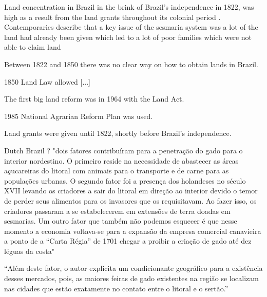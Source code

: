 \documentclass{article}
\begin{document}
Land concentration in Brazil in the brink of Brazil's independence in 1822, was high as a result from the land grants throughout its colonial period \parencite{Smith1972-dv}.
Contemporaries describe that a key issue of the sesmaria system was a lot of the land had already been given which led to a lot of poor families which were not able to claim land \parencite[p.~42-43]{Lima1954-td}



Between 1822 and 1850 there was no clear way on how to obtain lands in Brazil. 

1850 Land Law allowed [...]

The first big land reform was in 1964 with the Land Act.

1985 National Agrarian Reform Plan was used.

Land grants were given until 1822, shortly before Brazil's independence.



Dutch Brazil ? "dois fatores contribuíram para a penetração do gado para o interior nordestino. O primeiro reside na necessidade de abastecer as áreas açucareiras do litoral com animais para o transporte e de carne para as populações urbanas. O segundo fator foi a presença dos holandeses no século XVII levando os criadores a sair do litoral em direção ao interior devido o temor de perder seus alimentos para os invasores que os requisitavam. Ao fazer isso, os criadores passaram a se estabelecerem em extensões de terra doadas em sesmarias. Um outro fator que também não podemos esquecer é que nesse momento a economia voltava-se para a expansão da empresa comercial canavieira a ponto de a “Carta Régia” de 1701 chegar a proibir a criação de gado até dez léguas da costa" 

``Além deste fator, o autor explicita um condicionante geográfico para a existência desses mercados, pois, as maiores feiras de gado existentes na região se localizam nas cidades que estão exatamente no contato entre o litoral e o sertão.'' \parencite{Galdino_Dantas2008-pw}
\end{document}
